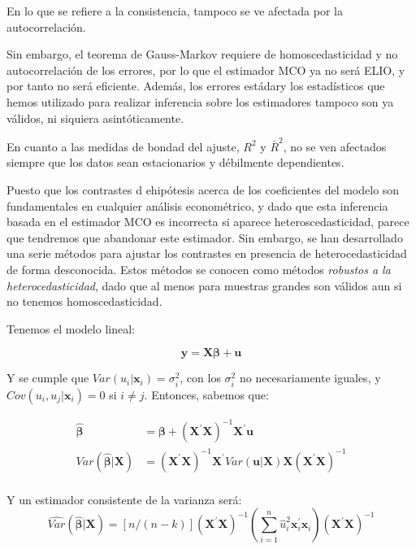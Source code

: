 En lo que se refiere a la consistencia, tampoco se ve afectada por la autocorrelaci\'on.

Sin embargo, el teorema de Gauss-Markov requiere de homoscedasticidad y no autocorrelaci\'on de los errores, por lo que el estimador MCO ya no ser\'a ELIO, y por tanto no ser\'a eficiente. Adem\'as, los errores est\'adary los estad\'isticos que hemos utilizado para realizar inferencia sobre los estimadores tampoco son ya v\'alidos, ni siquiera asint\'oticamente.

En cuanto a las medidas de bondad del ajuste, $R^2$ y $\bar{R}^2$, no se ven afectados siempre que los datos sean estacionarios y d\'ebilmente dependientes.



Puesto que los contrastes d ehip\'otesis acerca de los coeficientes del modelo son fundamentales en cualquier an\'alisis econom\'etrico, y dado que esta inferencia basada en el estimador MCO es incorrecta si aparece heteroscedasticidad, parece que tendremos que abandonar este estimador. Sin embargo, se han desarrollado una serie m\'etodos para ajustar los contrastes en presencia de heterocedasticidad de forma desconocida. Estos m\'etodos se conocen como m\'etodos \textit{robustos a la heterocedasticidad}, dado que al menos para muestras grandes son v\'alidos aun si no tenemos homoscedasticidad.

Tenemos el modelo lineal:

\begin{equation*}
\boldsymbol{y}=\boldsymbol{X\beta}+\boldsymbol{u}
\end{equation*}

Y se cumple que $Var(u_i|\boldsymbol{x}_i)=\sigma^2_i$, con los $\sigma^2_i$ no necesariamente iguales, y $Cov(u_i,u_j|\boldsymbol{x}_i)=0$ si $i\neq j$. Entonces, sabemos que:

\begin{align*}
\hat{\boldsymbol{\beta}}&=\boldsymbol{\beta}+\left(\boldsymbol{X}^{\prime}\boldsymbol{X}\right)^{-1}\boldsymbol{X}^{\prime}\boldsymbol{u} \\
Var(\hat{\boldsymbol{\beta}}|\boldsymbol{X})&=\left(\boldsymbol{X}^{\prime}\boldsymbol{X}\right)^{-1}\boldsymbol{X}^{\prime}Var(\boldsymbol{u}|\boldsymbol{X})\boldsymbol{X}\left(\boldsymbol{X}^{\prime}\boldsymbol{X}\right)^{-1} \\
\end{align*}

Y un estimador consistente de la varianza ser\'a:
\begin{equation*}
\hat{Var}(\hat{\boldsymbol{\beta}}|\boldsymbol{X})=[n/(n-k)]\left(\boldsymbol{X}^{\prime}\boldsymbol{X}\right)^{-1}\left(\sum_{i=1}^n\hat{u}_i^2\boldsymbol{x}_i^{\prime}\boldsymbol{x}_i\right)\left(\boldsymbol{X}^{\prime}\boldsymbol{X}\right)^{-1} 
\end{equation*}
